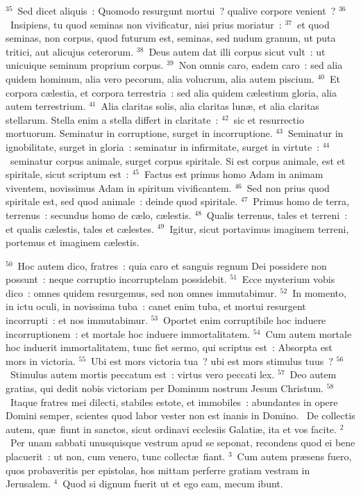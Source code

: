 ${}^{35}$~Sed dicet aliquis~: Quomodo resurgunt mortui~? qualive corpore venient~?
${}^{36}$~Insipiens, tu quod seminas non vivificatur, nisi prius moriatur~:
${}^{37}$~et quod seminas, non corpus, quod futurum est, seminas, sed nudum granum, ut puta tritici, aut alicujus ceterorum.
${}^{38}$~Deus autem dat illi corpus sicut vult~: ut unicuique seminum proprium corpus.
${}^{39}$~Non omnis caro, eadem caro~: sed alia quidem hominum, alia vero pecorum, alia volucrum, alia autem piscium.
${}^{40}$~Et corpora c\ae lestia, et corpora terrestria~: sed alia quidem c\ae lestium gloria, alia autem terrestrium.
${}^{41}$~Alia claritas solis, alia claritas lun\ae , et alia claritas stellarum. Stella enim a stella differt in claritate~:
${}^{42}$~sic et resurrectio mortuorum. Seminatur in corruptione, surget in incorruptione.
${}^{43}$~Seminatur in ignobilitate, surget in gloria~: seminatur in infirmitate, surget in virtute~:
${}^{44}$~seminatur corpus animale, surget corpus spiritale. Si est corpus animale, est et spiritale, sicut scriptum est~:
${}^{45}$~Factus est primus homo Adam in animam viventem, novissimus Adam in spiritum vivificantem.
${}^{46}$~Sed non prius quod spiritale est, sed quod animale~: deinde quod spiritale.
${}^{47}$~Primus homo de terra, terrenus~: secundus homo de c\ae lo, c\ae lestis.
${}^{48}$~Qualis terrenus, tales et terreni~: et qualis c\ae lestis, tales et c\ae lestes.
${}^{49}$~Igitur, sicut portavimus imaginem terreni, portemus et imaginem c\ae lestis.


${}^{50}$~Hoc autem dico, fratres~: quia caro et sanguis regnum Dei possidere non possunt~: neque corruptio incorruptelam possidebit.
${}^{51}$~Ecce mysterium vobis dico~: omnes quidem resurgemus, sed non omnes immutabimur.
${}^{52}$~In momento, in ictu oculi, in novissima tuba~: canet enim tuba, et mortui resurgent incorrupti~: et nos immutabimur.
${}^{53}$~Oportet enim corruptibile hoc induere incorruptionem~: et mortale hoc induere immortalitatem.
${}^{54}$~Cum autem mortale hoc induerit immortalitatem, tunc fiet sermo, qui scriptus est~: Absorpta est mors in victoria.
${}^{55}$~Ubi est mors victoria tua~? ubi est mors stimulus tuus~?
${}^{56}$~Stimulus autem mortis peccatum est~: virtus vero peccati lex.
${}^{57}$~Deo autem gratias, qui dedit nobis victoriam per Dominum nostrum Jesum Christum.
${}^{58}$~Itaque fratres mei dilecti, stabiles estote, et immobiles~: abundantes in opere Domini semper, scientes quod labor vester non est inanis in Domino.
~De collectis autem, qu\ae\ fiunt in sanctos, sicut ordinavi ecclesiis Galati\ae , ita et vos facite.
${}^{2}$~Per unam sabbati unusquisque vestrum apud se seponat, recondens quod ei bene placuerit~: ut non, cum venero, tunc collect\ae\ fiant.
${}^{3}$~Cum autem pr\ae sens fuero, quos probaveritis per epistolas, hos mittam perferre gratiam vestram in Jerusalem.
${}^{4}$~Quod si dignum fuerit ut et ego eam, mecum ibunt.


